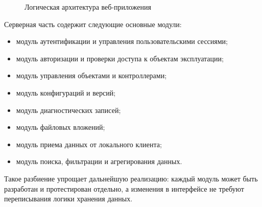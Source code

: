 \begin{figure}[ht!]
    \centering
    \caption{Логическая архитектура веб-приложения}
    \label{fig:logical_architecture}
\end{figure}

Серверная часть содержит следующие основные модули:
\begin{itemize}
    \item модуль аутентификации и управления пользовательскими сессиями;
    \item модуль авторизации и проверки доступа к объектам эксплуатации;
    \item модуль управления объектами и контроллерами;
    \item модуль конфигураций и версий;
    \item модуль диагностических записей;
    \item модуль файловых вложений;
    \item модуль приема данных от локального клиента;
    \item модуль поиска, фильтрации и агрегирования данных.
\end{itemize}

Такое разбиение упрощает дальнейшую реализацию: каждый модуль может быть
разработан и протестирован отдельно, а изменения в интерфейсе не требуют
переписывания логики хранения данных.

